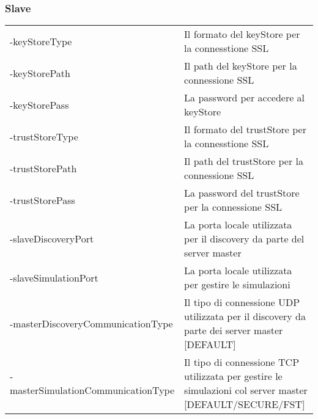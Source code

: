 \subsubsection{Slave}

\begin{table}[H]
    \begin{tabularx}{\linewidth}{ l X }
    -keyStoreType        & Il formato del keyStore per la connesstione SSL       \\
    -keyStorePath        & Il path del keyStore per la connessione SSL           \\
    -keyStorePass        & La password per accedere al keyStore                  \\
    -trustStoreType      & Il formato del trustStore per la connesstione SSL     \\
    -trustStorePath      & Il path del trustStore per la connessione SSL         \\
    -trustStorePass      & La password del trustStore per la connessione SSL     \\
    -slaveDiscoveryPort                & La porta locale utilizzata per il discovery da parte del server master                                              \\
    -slaveSimulationPort & La porta locale utilizzata per gestire le simulazioni \\
    -masterDiscoveryCommunicationType  & Il tipo di connessione UDP utilizzata per il discovery da parte dei server master [DEFAULT]              \\
    -masterSimulationCommunicationType & Il tipo di connessione TCP utilizzata per gestire le simulazioni col server master [DEFAULT/SECURE/FST]
    \end{tabularx}
\end{table}